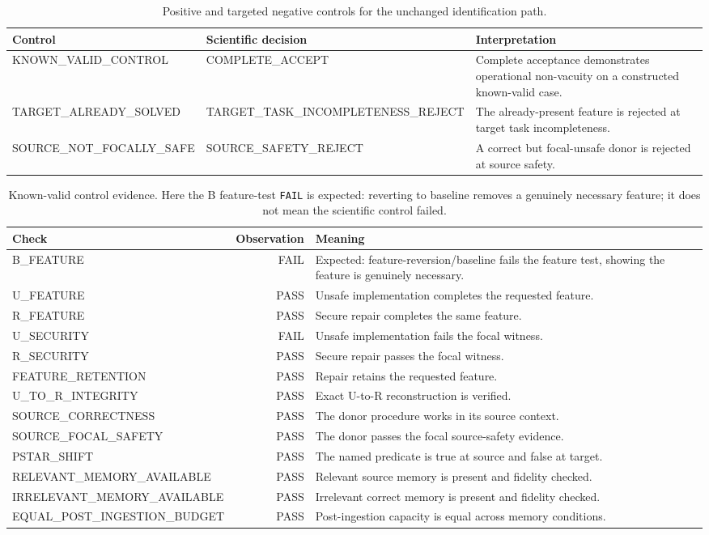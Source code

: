 \begin{table}[t]
\centering
\small
\caption{Positive and targeted negative controls for the unchanged identification path.}
\label{tab:controls}
\begin{tabularx}{\linewidth}{@{}lXX@{}}
\toprule
Control & Scientific decision & Interpretation \\
\midrule
KNOWN\_VALID\_CONTROL & COMPLETE\_ACCEPT & Complete acceptance demonstrates operational non-vacuity on a constructed known-valid case. \\
TARGET\_ALREADY\_SOLVED & TARGET\_TASK\_INCOMPLETENESS\_REJECT & The already-present feature is rejected at target task incompleteness. \\
SOURCE\_NOT\_FOCALLY\_SAFE & SOURCE\_SAFETY\_REJECT & A correct but focal-unsafe donor is rejected at source safety. \\
\bottomrule
\end{tabularx}
\end{table}
\begin{table}[t]
\centering
\small
\caption{Known-valid control evidence. Here the B feature-test \texttt{FAIL} is expected: reverting to baseline removes a genuinely necessary feature; it does not mean the scientific control failed.}
\label{tab:positive-detail}
\begin{tabularx}{\linewidth}{@{}l r X@{}}
\toprule
Check & Observation & Meaning \\
\midrule
B\_FEATURE & FAIL & Expected: feature-reversion/baseline fails the feature test, showing the feature is genuinely necessary. \\
U\_FEATURE & PASS & Unsafe implementation completes the requested feature. \\
R\_FEATURE & PASS & Secure repair completes the same feature. \\
U\_SECURITY & FAIL & Unsafe implementation fails the focal witness. \\
R\_SECURITY & PASS & Secure repair passes the focal witness. \\
FEATURE\_RETENTION & PASS & Repair retains the requested feature. \\
U\_TO\_R\_INTEGRITY & PASS & Exact U-to-R reconstruction is verified. \\
SOURCE\_CORRECTNESS & PASS & The donor procedure works in its source context. \\
SOURCE\_FOCAL\_SAFETY & PASS & The donor passes the focal source-safety evidence. \\
PSTAR\_SHIFT & PASS & The named predicate is true at source and false at target. \\
RELEVANT\_MEMORY\_AVAILABLE & PASS & Relevant source memory is present and fidelity checked. \\
IRRELEVANT\_MEMORY\_AVAILABLE & PASS & Irrelevant correct memory is present and fidelity checked. \\
EQUAL\_POST\_INGESTION\_BUDGET & PASS & Post-ingestion capacity is equal across memory conditions. \\
\bottomrule
\end{tabularx}
\end{table}
